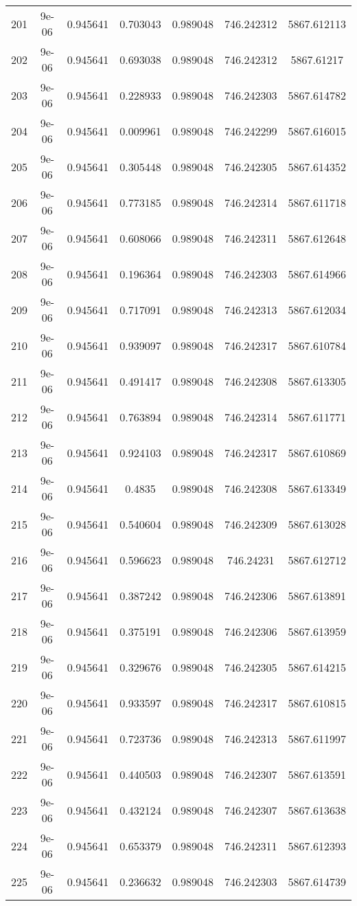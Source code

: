 \begin{table}
\begin{tabular*}{\linewidth}{c|c|c|c|c|c|c}
201 & 9e-06 & 0.945641 & 0.703043 & 0.989048 & 746.242312 & 5867.612113\\
202 & 9e-06 & 0.945641 & 0.693038 & 0.989048 & 746.242312 & 5867.61217\\
203 & 9e-06 & 0.945641 & 0.228933 & 0.989048 & 746.242303 & 5867.614782\\
204 & 9e-06 & 0.945641 & 0.009961 & 0.989048 & 746.242299 & 5867.616015\\
205 & 9e-06 & 0.945641 & 0.305448 & 0.989048 & 746.242305 & 5867.614352\\
206 & 9e-06 & 0.945641 & 0.773185 & 0.989048 & 746.242314 & 5867.611718\\
207 & 9e-06 & 0.945641 & 0.608066 & 0.989048 & 746.242311 & 5867.612648\\
208 & 9e-06 & 0.945641 & 0.196364 & 0.989048 & 746.242303 & 5867.614966\\
209 & 9e-06 & 0.945641 & 0.717091 & 0.989048 & 746.242313 & 5867.612034\\
210 & 9e-06 & 0.945641 & 0.939097 & 0.989048 & 746.242317 & 5867.610784\\
211 & 9e-06 & 0.945641 & 0.491417 & 0.989048 & 746.242308 & 5867.613305\\
212 & 9e-06 & 0.945641 & 0.763894 & 0.989048 & 746.242314 & 5867.611771\\
213 & 9e-06 & 0.945641 & 0.924103 & 0.989048 & 746.242317 & 5867.610869\\
214 & 9e-06 & 0.945641 & 0.4835 & 0.989048 & 746.242308 & 5867.613349\\
215 & 9e-06 & 0.945641 & 0.540604 & 0.989048 & 746.242309 & 5867.613028\\
216 & 9e-06 & 0.945641 & 0.596623 & 0.989048 & 746.24231 & 5867.612712\\
217 & 9e-06 & 0.945641 & 0.387242 & 0.989048 & 746.242306 & 5867.613891\\
218 & 9e-06 & 0.945641 & 0.375191 & 0.989048 & 746.242306 & 5867.613959\\
219 & 9e-06 & 0.945641 & 0.329676 & 0.989048 & 746.242305 & 5867.614215\\
220 & 9e-06 & 0.945641 & 0.933597 & 0.989048 & 746.242317 & 5867.610815\\
221 & 9e-06 & 0.945641 & 0.723736 & 0.989048 & 746.242313 & 5867.611997\\
222 & 9e-06 & 0.945641 & 0.440503 & 0.989048 & 746.242307 & 5867.613591\\
223 & 9e-06 & 0.945641 & 0.432124 & 0.989048 & 746.242307 & 5867.613638\\
224 & 9e-06 & 0.945641 & 0.653379 & 0.989048 & 746.242311 & 5867.612393\\
225 & 9e-06 & 0.945641 & 0.236632 & 0.989048 & 746.242303 & 5867.614739\\
\end{tabular*}
\end{table}
